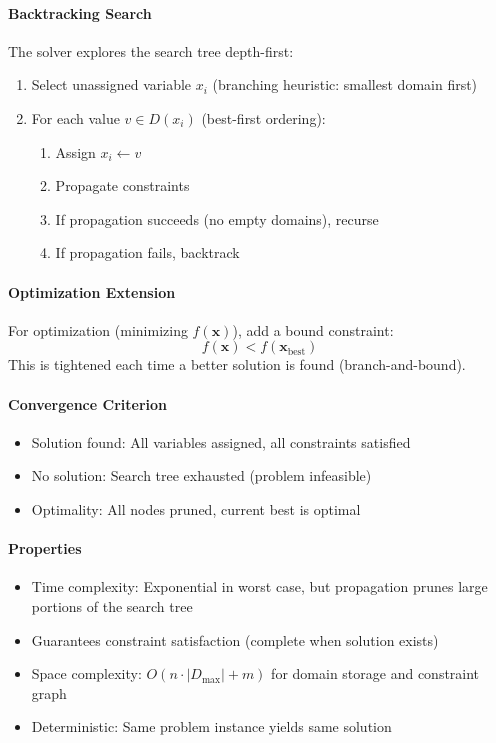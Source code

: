 \paragraph{Backtracking Search}
The solver explores the search tree depth-first:
\begin{enumerate}
\item Select unassigned variable $x_i$ (branching heuristic: smallest domain first)
\item For each value $v \in D(x_i)$ (best-first ordering):
\begin{enumerate}
\item Assign $x_i \leftarrow v$
\item Propagate constraints
\item If propagation succeeds (no empty domains), recurse
\item If propagation fails, backtrack
\end{enumerate}
\end{enumerate}

\paragraph{Optimization Extension}
For optimization (minimizing $f(\mathbf{x})$), add a bound constraint:
\begin{equation}
f(\mathbf{x}) < f(\mathbf{x}_{\text{best}})
\end{equation}
This is tightened each time a better solution is found (branch-and-bound).

\paragraph{Convergence Criterion}
\begin{itemize}
\item Solution found: All variables assigned, all constraints satisfied
\item No solution: Search tree exhausted (problem infeasible)
\item Optimality: All nodes pruned, current best is optimal
\end{itemize}

\paragraph{Properties}
\begin{itemize}
\item Time complexity: Exponential in worst case, but propagation prunes large portions of the search tree
\item Guarantees constraint satisfaction (complete when solution exists)
\item Space complexity: $O(n \cdot |D_{\max}| + m)$ for domain storage and constraint graph
\item Deterministic: Same problem instance yields same solution
\end{itemize}

